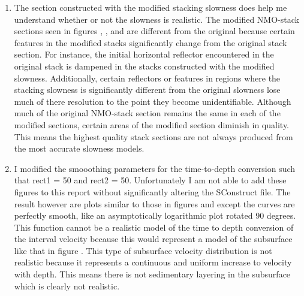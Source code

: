 \begin{enumerate}
  \item The section constructed with the modified stacking slowness does help me understand whether or not the slowness is realistic. The modified NMO-stack sections seen in figures , , and  are  different from the original because certain features in the modified stacks significantly change from the original stack section. For instance, the initial horizontal reflector encountered in the original stack is dampened in the stacks constructed with the modified slowness. Additionally, certain reflectors or features in regions where the stacking slowness is significantly different from the original slowness lose much of there resolution to the point they become unidentifiable. Although much of the original NMO-stack section remains the same in each of the modified sections, certain areas of the modified section diminish in quality. This means the highest quality stack sections are not always produced from the most accurate slowness models.  



  \item I modified the smooothing parameters for the time-to-depth conversion such that rect1 = 50 and rect2 = 50. Unfortunately I am not able to add these figures to this report without significantly altering the SConstruct file. The result however are plots similar to those in figures  and  except the curves are perfectly smooth, like an asymptotically logarithmic plot rotated 90 degrees. This function cannot be a realistic model of the time to depth conversion of the interval velocity because this would represent a model of the subsurface like that in figure . This type of subsurface velocity distribution is not realistic because it represents a continuous and uniform increase to velocity with depth. This means there is not sedimentary layering in the subsurface which is clearly not realistic.

\end{enumerate}



